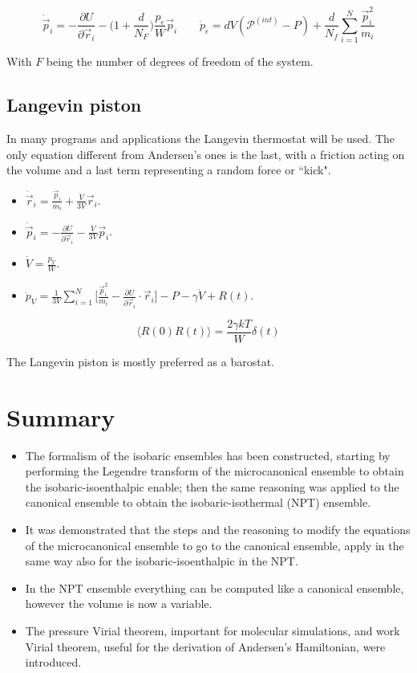 $$\dot{\vec{p}}_i = -\frac{\partial U}{\partial\vec{r}_i} - \biggl(1+\frac{d}{N_F}\biggr)\frac{p_\epsilon}{W}\vec{p}_i\qquad \dot{p}_\epsilon = dV(\mathcal{P}^{(int)}-P) + \frac{d}{N_f}\sum\limits_{i=1}^N\frac{\vec{p}_i^2}{m_i}$$

With $F$ being the number of degrees of freedom of the system.

	\subsection{Langevin piston}
	In many programs and applications  the Langevin thermostat will be used.
	The only equation different from Andersen's ones is the last, with a friction acting on the volume and a last term representing a random force or ``kick".

	\begin{itemize}
		\item $\dot{\vec{r}}_i = \frac{\vec{p}_i}{m_i} + \frac{\dot{V}}{3V}\vec{r}_i$.
		\item $\dot{\vec{p}}_i = -\frac{\partial U}{\partial\vec{r}_i}-\frac{\dot{V}}{3V}\vec{p}_i$.
		\item $\dot{V} = \frac{p_V}{W}$.
		\item $\dot{p}_V = \frac{1}{3V}\sum\limits_{i=1}^N\biggl[\frac{\vec{p}_i^2}{m_i}-\frac{\partial U}{\partial\vec{r}_i}\cdot\vec{r}_i\biggr]-P-\gamma\dot{V}+R(t)$.
	\end{itemize}

	$$\langle R(0)R(t)\rangle = \frac{2\gamma kT}{W}\delta(t)$$

	The Langevin piston is mostly preferred as a barostat.

\section{Summary}

\begin{multicols}{2}
	\begin{itemize}
		\item The formalism of the isobaric ensembles has been constructed, starting by performing the Legendre transform of the microcanonical ensemble to obtain the isobaric-isoenthalpic enable; then the same reasoning was applied to the canonical ensemble to obtain the isobaric-isothermal (NPT) ensemble.
		\item It was demonstrated that the steps and the reasoning to modify the equations of the microcanonical ensemble to go to the canonical ensemble, apply in the same way also for the isobaric-isoenthalpic in the NPT.
		\item In the NPT ensemble everything can be computed like a canonical ensemble, however the volume is now a variable.
		\item The pressure Virial theorem, important for molecular simulations, and work Virial theorem, useful for the derivation of Andersen's Hamiltonian, were introduced.
		\end{itemize}
\end{multicols}
